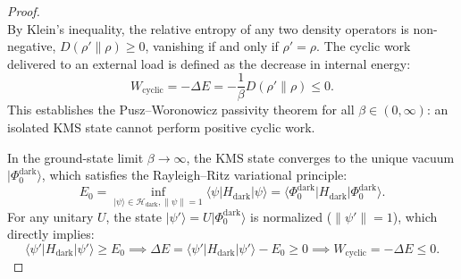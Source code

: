 \documentclass[11pt,onecolumn]{article}
\begin{document}
\begin{proof}
\begin{equation}
\end{equation}
By Klein's inequality, the relative entropy of any two density operators is non-negative, $D(\rho' \parallel \rho) \ge 0$, vanishing if and only if $\rho' = \rho$. The cyclic work delivered to an external load is defined as the decrease in internal energy:
\begin{equation}
W_{\text{cyclic}} = -\Delta E = -\frac{1}{\beta} D(\rho' \parallel \rho) \le 0.
\end{equation}
This establishes the Pusz--Woronowicz passivity theorem for all $\beta \in (0, \infty)$: an isolated KMS state cannot perform positive cyclic work.

In the ground-state limit $\beta \to \infty$, the KMS state converges to the unique vacuum $|\Phi_0^{\text{dark}}\rangle$, which satisfies the Rayleigh--Ritz variational principle:
\begin{equation}
E_0 = \inf_{|\psi\rangle \in \mathcal{H}_{\text{dark}}, \|\psi\|=1} \langle \psi | H_{\text{dark}} | \psi \rangle = \langle \Phi_0^{\text{dark}} | H_{\text{dark}} | \Phi_0^{\text{dark}} \rangle.
\end{equation}
For any unitary $U$, the state $|\psi'\rangle = U |\Phi_0^{\text{dark}}\rangle$ is normalized ($\|\psi'\| = 1$), which directly implies:
\begin{equation}
\langle \psi' | H_{\text{dark}} | \psi' \rangle \ge E_0 \implies \Delta E = \langle \psi' | H_{\text{dark}} | \psi' \rangle - E_0 \ge 0 \implies W_{\text{cyclic}} = -\Delta E \le 0.
\end{equation}


\end{proof}
\end{document}
